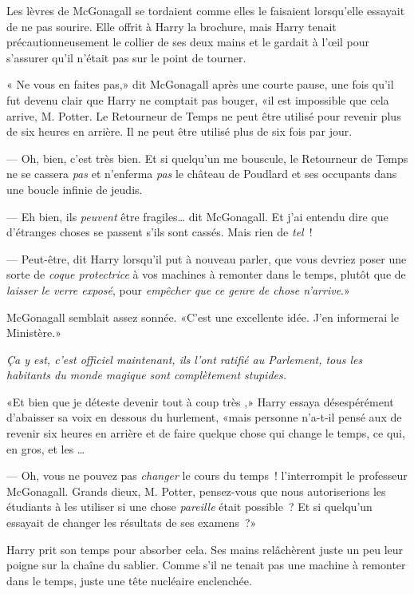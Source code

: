 Les lèvres de McGonagall se tordaient comme elles le faisaient lorsqu'elle essayait de ne pas sourire. Elle offrit à Harry la brochure, mais Harry tenait précautionneusement le collier de ses deux mains et le gardait à l'œil pour s'assurer qu'il n'était pas sur le point de tourner.

« Ne vous en faites pas,» dit McGonagall après une courte pause, une fois qu'il fut devenu clair que Harry ne comptait pas bouger, «il est impossible que cela arrive, M. Potter. Le Retourneur de Temps ne peut être utilisé pour revenir plus de six heures en arrière. Il ne peut être utilisé plus de six fois par jour.

--- Oh, bien, c'est très bien. Et si quelqu'un me bouscule, le Retourneur de Temps ne se cassera \emph{pas} et n'enferma \emph{pas} le château de Poudlard et ses occupants dans une boucle infinie de jeudis.

--- Eh bien, ils \emph{peuvent} être fragiles… dit McGonagall. Et j'ai entendu dire que d'étranges choses se passent s'ils sont cassés. Mais rien de \emph{tel}~!

--- Peut-être, dit Harry lorsqu'il put à nouveau parler, que vous devriez poser une sorte de \emph{coque protectrice} à vos machines à remonter dans le temps, plutôt que de \emph{laisser le verre exposé}, pour \emph{empêcher que ce genre de chose n'arrive}.»

McGonagall semblait assez sonnée. «C'est une excellente idée. J'en informerai le Ministère.»

\emph{Ça y est, c'est officiel maintenant, ils l'ont ratifié au Parlement, tous les habitants du monde magique sont complètement stupides.}

«Et bien que je déteste devenir tout à coup très ,» Harry essaya désespérément d'abaisser sa voix en dessous du hurlement, «mais personne n'a-t-il pensé aux  de revenir six heures en arrière et de faire quelque chose qui change le temps, ce qui, en gros,  et les …

--- Oh, vous ne pouvez pas \emph{changer} le cours du temps~! l'interrompit le professeur McGonagall. Grands dieux, M. Potter, pensez-vous que nous autoriserions les étudiants à les utiliser si une chose \emph{pareille} était possible~? Et si quelqu'un essayait de changer les résultats de ses examens~?»

Harry prit son temps pour absorber cela. Ses mains relâchèrent juste un peu leur poigne sur la chaîne du sablier. Comme s'il ne tenait pas une machine à remonter dans le temps, juste une tête nucléaire enclenchée.

